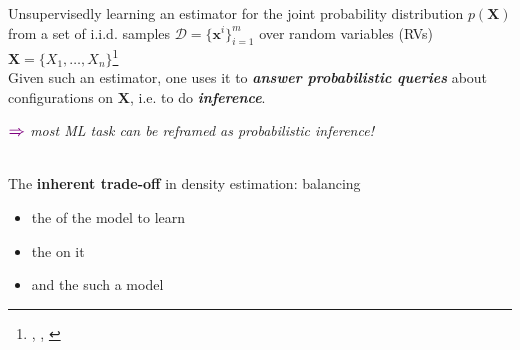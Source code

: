 \documentclass[xcolor={usenames,dvipsnames,svgnames}, compress, aspectratio=169, 11pt]{beamer}
\newcommand{\customcite}[1]{\footnote{\tiny \citeauthor{#1},
    \citetitle{#1}, \citeyear{#1}}}
\begin{document}
\begin{frame}[t]
  \frametitle{}

  Unsupervisedly learning an estimator for the joint probability distribution
    $p(\mathbf{X})$ from a set of i.i.d. samples $\mathcal{D}=\{\mathbf
    x^i\}_{i=1}^m$ over random variables (RVs) $\mathbf{X}=\{X_{1},\dots,X_{n}\}$\customcite{Poon2011}\\[17pt]
    
    Given such an estimator, one uses it to \textbf{\emph{answer
    probabilistic queries}} about configurations on $\mathbf{X}$,
i.e. to do \emph{\textbf{inference}}.\par
\begin{minipage}{1.0\linewidth}
     \vspace{-25pt}
          \raggedleft
          {$\color{violet}\boldsymbol\Rightarrow$
          {\footnotesize
            \emph{most ML task can be reframed as probabilistic inference!}\\
          }}
      
     
\end{minipage}\\[17pt]

    The \textbf{inherent trade-off} in density estimation: balancing
    \begin{itemize}
      \setlength\itemsep{0pt}
    \item the  of the model to learn
      \item the  on it
    \item and the 
      such a model
      
    \end{itemize}

\end{frame}
\end{document}

